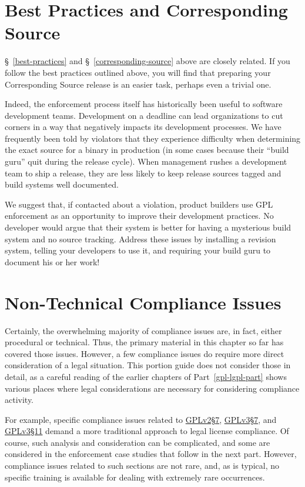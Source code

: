 \section{Best Practices and Corresponding Source}

\S~\ref{best-practices} and \S~\ref{corresponding-source} above are
closely related.  If you follow the best practices outlined above, you
will find that preparing your Corresponding Source release is an easier
task, perhaps even a trivial one.

Indeed, the enforcement process itself has historically been useful to
software development teams.  Development on a deadline can lead
organizations to cut corners in a way that negatively impacts its
development processes.  We have frequently been told by violators that
they experience difficulty when determining the exact source for a binary
in production (in some cases because their ``build guru'' quit during the
release cycle).  When management rushes a development team to ship a
release, they are less likely to keep release sources tagged and build
systems well documented.

We suggest that, if contacted about a violation, product builders use GPL
enforcement as an opportunity to improve their development practices.  No
developer would argue that their system is better for having a mysterious
build system and no source tracking.  Address these issues by installing a
revision system, telling your developers to use it, and requiring your
build guru to document his or her work!


\section{Non-Technical Compliance Issues}

Certainly, the overwhelming majority of compliance issues are, in fact,
either procedural or technical.  Thus, the primary material in this chapter
so far has covered those issues.  However, a few compliance issues do require
more direct consideration of a legal situation.  This portion guide does not
consider those in detail, as a careful reading of the earlier chapters of
Part~\ref{gpl-lgpl-part} shows various places where legal considerations are
necessary for considering compliance activity.

For example, specific compliance issues related to
\hyperref[GPLv2s7]{GPLv2\S7}, \hyperref[GPLv3s7]{GPLv3\S7}, and
\hyperref[GPLv3s7]{GPLv3\S11} demand a more traditional approach to legal
license compliance.  Of course, such analysis and consideration can be
complicated, and some are considered in the enforcement case studies that
follow in the next part.  However, compliance issues related to such sections
are not rare, and, as is typical, no specific training is available for
dealing with extremely rare occurrences.

